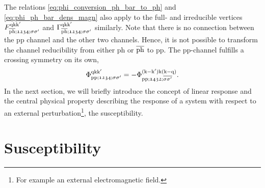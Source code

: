 \documentclass[../../main.tex]{subfiles}
\begin{document}
The relations \eqref{eq:phi_conversion_ph_bar_to_ph} and \eqref{eq:phi_ph_bar_dens_magn} also apply to the full- and irreducible vertices $F_{\overline{\text{ph}};\mathfrak{1234};\sigma\sigma'}^{\text{q}\text{k}\text{k}'}$ and $\Gamma_{\overline{\text{ph}};\mathfrak{1234};\sigma\sigma'}^{\text{q}\text{k}\text{k}'}$ similarly. Note that there is no connection between the pp channel and the other two channels. Hence, it is not possible to transform the channel reducibility from either ph or $\overline{\text{ph}}$ to pp. The pp-channel fulfills a crossing symmetry on its own,
\begin{align}
	\Phi^{\text{q}\text{k}\text{k}'}_{\text{pp};\mathfrak{1234};\sigma\sigma'}=-\Phi^{(\text{k}-\text{k}')\text{k}(\text{k}-\text{q})}_{\text{pp};\mathfrak{1432};\overline{\sigma\sigma'}}.
\end{align}
In the next section, we will briefly introduce the concept of linear response and the central physical property describing the response of a system with respect to an external perturbation\footnote{For example an external electromagnetic field.}, the susceptibility.

\section{Susceptibility}
\end{document}
